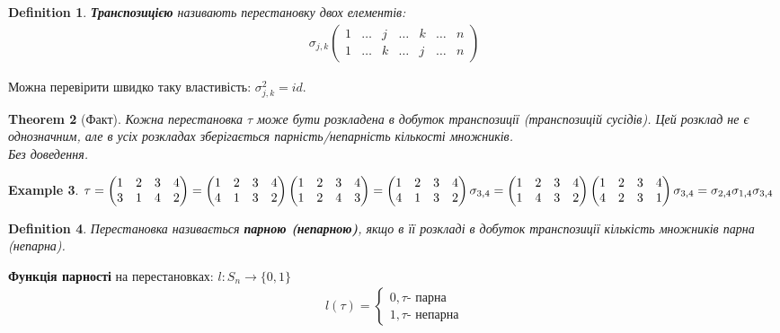 \documentclass[a4paper, 10pt]{article}
\theoremstyle{theoremdd}
\newtheorem{theorem}{Theorem}[subsection]
\theoremstyle{theoremdd}
\newtheorem{definition}[theorem]{Definition}
\theoremstyle{theoremdd}
\theoremstyle{theoremdd}
\newtheorem{example}[theorem]{Example}
\theoremstyle{theoremdd}
\theoremstyle{theoremdd}
\theoremstyle{theoremdd}
\theoremstyle{theoremdd}
\begin{document}
	\begin{definition}
	\textbf{Транспозицією} називають перестановку двох елементів:
	\begin{align*}
	\sigma_{j,k} \begin{pmatrix}
	1 & \dots & j & \dots & k & \dots & n \\
	1 & \dots & k & \dots & j & \dots & n
	\end{pmatrix}
	\end{align*}
	\end{definition}
	Можна перевірити швидко таку властивість: $\sigma_{j,k}^2 = id$.
	
	\begin{theorem}[Факт]
	Кожна перестановка $\tau$ може бути розкладена в добуток транспозиції (транспозицій сусідів). Цей розклад не є однозначним, але в усіх розкладах зберігається парність/непарність кількості множників.\\
	\textit{Без доведення.}
	\end{theorem}
	
	\begin{example}
	$\tau = \begin{pmatrix}
	1 & 2 & 3 & 4 \\
	3 & 1 & 4 & 2
	\end{pmatrix} = \begin{pmatrix}
	1 & 2 & 3 & 4 \\
	4 & 1 & 3 & 2
	\end{pmatrix} \begin{pmatrix}
	1 & 2 & 3 & 4 \\
	1 & 2 & 4 & 3
	\end{pmatrix} = \begin{pmatrix}
	1 & 2 & 3 & 4 \\
	4 & 1 & 3 & 2
	\end{pmatrix} \sigma_{3,4} \\ = \begin{pmatrix}
	1 & 2 & 3 & 4 \\
	1 & 4 & 3 & 2
	\end{pmatrix} \begin{pmatrix}
	1 & 2 & 3 & 4 \\
	4 & 2 & 3 & 1
	\end{pmatrix} \sigma_{3,4} = \sigma_{2,4}\sigma_{1,4}\sigma_{3,4}$
	\end{example}

		
	\begin{definition}
	Перестановка називається \textbf{парною (непарною)}, якщо в її розкладі в добуток транспозиції кількість множників парна (непарна).
	\end{definition}
	\textbf{Функція парності} на перестановках: $l: S_n \to \{0,1\}$
	\begin{align*}
	l(\tau) = \begin{cases} 0, \tau \textrm{- парна} \\ 1, \tau \textrm{- непарна} \end{cases}
	\end{align*}
	
\end{document}
